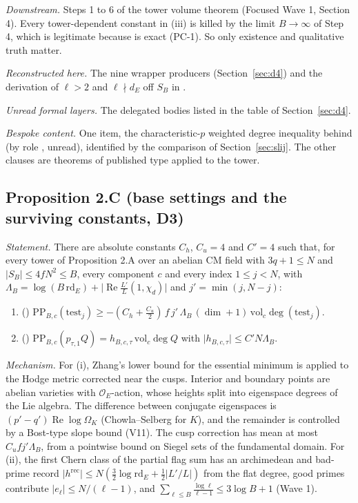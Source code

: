 \documentclass[11pt]{article}
\theoremstyle{remark}
\begin{document}
\emph{Downstream.} Steps 1 to 6 of the tower volume theorem (Focused Wave 1, Section 4). Every tower-dependent constant in (iii) is killed by the limit $B\to\infty$ of Step 4, which is legitimate because  is exact (PC-1). So only existence and qualitative truth matter.

\emph{Reconstructed here.} The nine wrapper producers (Section~\ref{sec:d4}) and the derivation of $\ell>2$ and $\ell\nmid d_E$ off $S_B$ in .

\emph{Unread formal layers.} The delegated bodies listed in the table of Section~\ref{sec:d4}.

\emph{Bespoke content.} One item, the characteristic-$p$ weighted degree inequality behind  (by role , unread), identified by the comparison of Section~\ref{sec:slij}. The other clauses are theorems of published type applied to the tower.

\subsection*{Proposition 2.C (base settings and the surviving constants, D3)}

\emph{Statement.} There are absolute constants $C_h$, $C_u=4$ and $C'=4$ such that, for every tower of Proposition 2.A over an abelian CM field with $3q+1\le N$ and $\lvert S_B\rvert\le4fN^2\le B$, every component $c$ and every index $1\le j<N$, with $\Lambda_B=\log(B\,\mathrm{rd}_E)+\lvert\operatorname{Re}\frac{L'}L(1,\chi_d)\rvert$ and $j'=\min(j,N-j)$:
\begin{enumerate}[label=(\roman*),nosep]
\item () $\mathrm{PP}_{B,c}(\mathrm{test}_j)\ge-(C_h+\tfrac{C_u}2)\,f\,j'\,\Lambda_B\,(\dim+1)\,\mathrm{vol}_c\deg(\mathrm{test}_j)$.
\item () $\mathrm{PP}_{B,c}(p_{\tau,1}Q)=h_{B,c,\tau}\,\mathrm{vol}_c\deg Q$ with $\lvert h_{B,c,\tau}\rvert\le C'N\Lambda_B$.
\end{enumerate}

\emph{Mechanism.} For (i), Zhang's lower bound for the essential minimum is applied to the Hodge metric corrected near the cusps. Interior and boundary points are abelian varieties with $\mathcal O_E$-action, whose heights split into eigenspace degrees of the Lie algebra. The difference between conjugate eigenspaces is $(p'-q')\operatorname{Re}\log\Omega_K$ (Chowla--Selberg for $K$), and the remainder is controlled by a Bost-type slope bound (V11). The cusp correction has mean at most $C_uf j'\Lambda_B$, from a pointwise bound on Siegel sets of the fundamental domain. For (ii), the first Chern class of the partial flag sum has an archimedean and bad-prime record $\lvert h^{\mathrm{rec}}\rvert\le N(\tfrac32\log\mathrm{rd}_E+\tfrac12\lvert L'/L\rvert)$ from the flat degree, good primes contribute $\lvert e_\ell\rvert\le N/(\ell-1)$, and $\sum_{\ell\le B}\frac{\log\ell}{\ell-1}\le3\log B+1$ (Wave 1).
\end{document}
